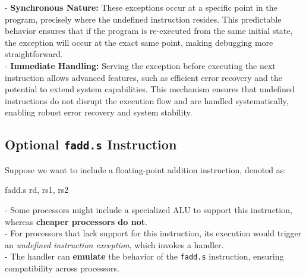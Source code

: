 - \textbf{Synchronous Nature:} These exceptions occur at a specific point in the program, precisely where the undefined instruction resides. This predictable behavior ensures that if the program is re-executed from the same initial state, the exception will occur at the exact same point, making debugging more straightforward. \\ \vspace{0.5cm}
- \textbf{Immediate Handling:} Serving the exception before executing the next instruction allows advanced features, such as efficient error recovery and the potential to extend system capabilities.
\vspace{0.5cm}
This mechanism ensures that undefined instructions do not disrupt the execution flow and are handled systematically, enabling robust error recovery and system stability.

\subsection{Optional \texttt{fadd.s} Instruction}

Suppose we want to include a floating-point addition instruction, denoted as:
\begin{assembly}
fadd.s rd, rs1, rs2
\end{assembly}

- Some processors might include a specialized ALU to support this instruction, whereas \textbf{cheaper processors do not}. \\ \vspace{7px}
- For processors that lack support for this instruction, its execution would trigger an \textit{undefined instruction exception}, which invokes a handler. \\ \vspace{7px}
- The handler can \textbf{emulate} the behavior of the \texttt{fadd.s} instruction, ensuring compatibility across processors. \\ \vspace{7px}

